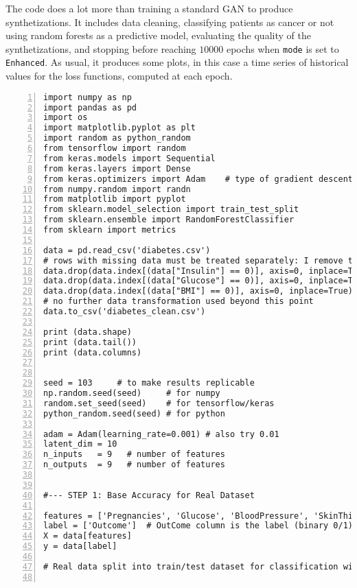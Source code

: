 \documentclass[oneside,10pt]{book}
\begin{document}
The code does a lot more than training a standard GAN to produce synthetizations. It includes data cleaning, classifying patients as cancer or not  using random forests as a predictive model, evaluating the quality of the synthetizations, and stopping before reaching $\num{10000}$
epochs  when \texttt{mode} is set to \texttt{\textquotesingle Enhanced\textquotesingle }. As usual, it produces some plots, in this case a time series of historical values for the loss functions, computed at each \textcolor{index}{epoch}. \vspace{1ex}

\begin{lstlisting}[numbers=left]
import numpy as np
import pandas as pd
import os
import matplotlib.pyplot as plt
import random as python_random
from tensorflow import random
from keras.models import Sequential
from keras.layers import Dense
from keras.optimizers import Adam    # type of gradient descent optimizer
from numpy.random import randn
from matplotlib import pyplot
from sklearn.model_selection import train_test_split
from sklearn.ensemble import RandomForestClassifier
from sklearn import metrics

data = pd.read_csv('diabetes.csv')
# rows with missing data must be treated separately: I remove them here
data.drop(data.index[(data["Insulin"] == 0)], axis=0, inplace=True) 
data.drop(data.index[(data["Glucose"] == 0)], axis=0, inplace=True) 
data.drop(data.index[(data["BMI"] == 0)], axis=0, inplace=True) 
# no further data transformation used beyond this point
data.to_csv('diabetes_clean.csv')

print (data.shape)
print (data.tail())
print (data.columns)


seed = 103     # to make results replicable
np.random.seed(seed)     # for numpy
random.set_seed(seed)    # for tensorflow/keras
python_random.seed(seed) # for python

adam = Adam(learning_rate=0.001) # also try 0.01
latent_dim = 10
n_inputs   = 9   # number of features
n_outputs  = 9   # number of features


#--- STEP 1: Base Accuracy for Real Dataset

features = ['Pregnancies', 'Glucose', 'BloodPressure', 'SkinThickness', 'Insulin', 'BMI', 'DiabetesPedigreeFunction', 'Age']
label = ['Outcome']  # OutCome column is the label (binary 0/1) 
X = data[features]
y = data[label] 

# Real data split into train/test dataset for classification with random forest


\end{lstlisting}
\end{document}
